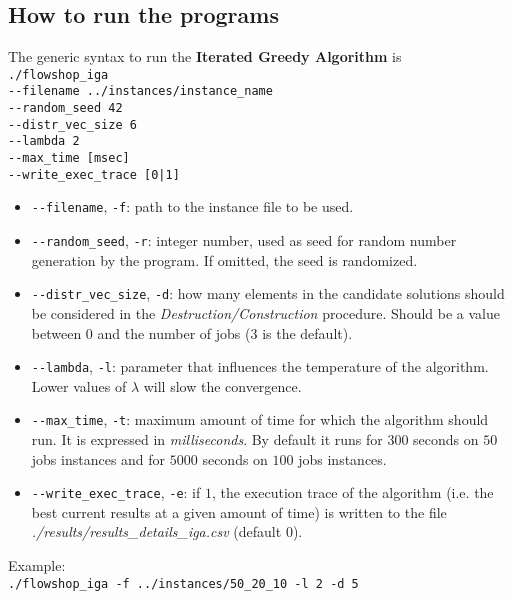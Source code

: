 \documentclass[
12pt,
a4paper,
oneside,
headinclude,
footinclude]{article}
\theoremstyle{definition} %
\begin{document}
\newpage
\subsection{\textbf{How to run the programs}}
The generic syntax to run the \textbf{Iterated Greedy Algorithm} is\\
\-\quad\texttt{./flowshop\_iga} \\
\-\quad\quad\texttt{-{}-filename ../instances/instance\_name} \\
\-\quad\quad\texttt{-{}-random\_seed 42} \\
\-\quad\quad\texttt{-{}-distr\_vec\_size 6} \\
\-\quad\quad\texttt{-{}-lambda 2} \\
\-\quad\quad\texttt{-{}-max\_time [msec]} \\
\-\quad\quad\texttt{-{}-write\_exec\_trace [0|1]} \\


\begin{itemize}
    \item \texttt{-{}-filename}, \texttt{-f}: path to the instance file to be used.
    \item \texttt{-{}-random\_seed}, \texttt{-r}: integer number, used as seed for random number generation by the program. If omitted, the seed is randomized.
    \item \texttt{-{}-distr\_vec\_size}, \texttt{-d}: how many elements in the candidate solutions should be considered in the \textit{Destruction/Construction} procedure. Should be a value between $0$ and the number of jobs ($3$ is the default).
    \item \texttt{-{}-lambda}, \texttt{-l}: parameter that influences the temperature of the algorithm. Lower values of $\lambda$ will slow the convergence. 
    \item \texttt{-{}-max\_time}, \texttt{-t}: maximum amount of time for which the algorithm should run. It is expressed in \textit{milliseconds}.
    By default it runs for $300$ seconds on $50$ jobs instances and for $5000$ seconds on $100$ jobs instances.
    \item \texttt{-{}-write\_exec\_trace}, \texttt{-e}: if $1$, the execution trace of the algorithm (i.e. the best current results at a given amount of time) is written to the file \textit{./results/results\_details\_iga.csv} (default $0$).
\end{itemize}

Example:\\
\quad\texttt{./flowshop\_iga -f ../instances/50\_20\_10 -l 2 -d 5}
\end{document}

